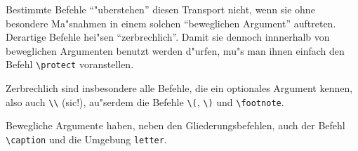 Bestimmte Befehle "`"uberstehen"' diesen Transport nicht, wenn sie
ohne besondere Ma"snahmen in einem solchen "`beweglichen Argument"'
auftreten.
Derartige Befehle hei"sen "`zerbrechlich"'.  Damit sie dennoch innnerhalb
von beweglichen Argumenten benutzt werden d"urfen, 
mu"s man ihnen einfach den Befehl \verb|\protect| voranstellen.

Zerbrechlich sind insbesondere alle Befehle, die ein optionales Argument
kennen, also auch \verb|\\| (sic!),
au"serdem die Befehle \verb|\(|, \verb|\)| und \verb|\footnote|.

Bewegliche Argumente haben, neben den Gliederungsbefehlen,
auch der Befehl \verb|\caption| und die Umgebung \texttt{letter}.

\iffalse
Die meisten \LaTeX-Befehle sind "`robust"', d.\,h.\ sie liefern
immer das ge\-w"unsch\-te Ergebnis.
 
Es gibt aber auch sogenannte "`zerbrechliche"' Befehle, die in
bestimmten Situationen (innerhalb von sogenannten "`bewegten"'
Parametern) nur dann richtig funktionieren, wenn man den Befehl
\verb|\protect| voranstellt.

Zu den zerbrechlichen Befehlen z"ahlen unter anderem die in
Tabelle~\ref{sizes} auf Seite~\pageref{sizes} an"-ge"-f"uhrten
Befehle, die die Schrift"-gr"o"se ver"-"andern, die Befehle
\verb|\cite|, \verb|\ref| und \verb|\pageref| f"ur Literatur- und
Querverweise und der Befehl \verb|\footnote|.
Es gibt also einige wenige (und sehr selten auftretende)
Spezial"-f"alle, in denen man z.\,B.\ \verb|\protect\cite| statt
\verb|\cite| schreiben mu"s.  Wann solche Spezial"-f"alle
auftreten, ist im \manual\ angegeben.
\fi

\endinput
